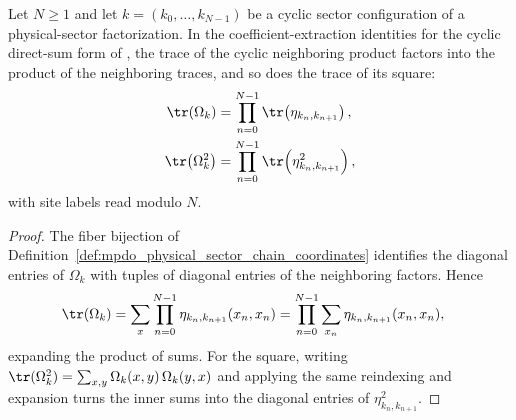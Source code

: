 \begin{lemma}
    \label{thm:mpdo_cyclic_neighboring_trace_products}
    \leanok
    Let $N\geq1$ and let $k=(k_0,\ldots,k_{N-1})$ be a cyclic sector
    configuration of a physical-sector factorization. In the
    coefficient-extraction identities for the cyclic direct-sum form of
    \cite[Appendix~C.2, lines~1580--1593]{Cirac2016MPDO_arXiv}, the trace of
    the cyclic neighboring product factors into the product of the
    neighboring traces, and so does the trace of its square:
    \begin{align}
        \tr(\Omega_k)
         & =\prod_{n=0}^{N-1}\tr\!\left(\eta_{k_n,k_{n+1}}\right),
        \notag                                                     \\
        \tr\!\left(\Omega_k^2\right)
         & =\prod_{n=0}^{N-1}
        \tr\!\left(\eta_{k_n,k_{n+1}}^2\right),
        \notag
    \end{align}
    with site labels read modulo $N$.
\end{lemma}

\begin{proof}
    \leanok
    The fiber bijection of
    Definition~\ref{def:mpdo_physical_sector_chain_coordinates}
    identifies the diagonal entries of $\Omega_k$ with tuples of
    diagonal entries of the neighboring factors. Hence
    \begin{align}
        \tr(\Omega_k)
         & =\sum_x\prod_{n=0}^{N-1}
        \eta_{k_n,k_{n+1}}(x_n,x_n)
        =\prod_{n=0}^{N-1}\sum_{x_n}
        \eta_{k_n,k_{n+1}}(x_n,x_n),
        \notag
    \end{align}
    expanding the product of sums. For the square, writing
    $\tr(\Omega_k^2)=\sum_{x,y}\Omega_k(x,y)\,\Omega_k(y,x)$ and applying the
    same reindexing and expansion turns the inner sums into the diagonal
    entries of $\eta_{k_n,k_{n+1}}^2$.
\end{proof}

